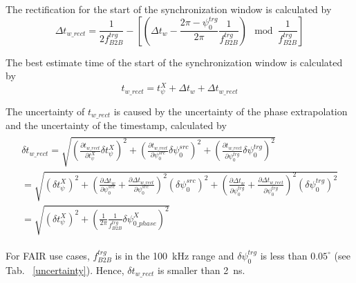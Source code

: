 The rectification for the start of the synchronization window is calculated by
\begin{equation}
\Delta t_\mathit{w\_rect}=\frac{1}{2f^\mathit{trg}_\mathit{B2B}}-[(\Delta t_\mathit{w} - \frac{2\pi-\psi^\mathit{trg}_0}{2\pi}\frac{1}{f^\mathit{trg}_\mathit{B2B}}) \mod \frac{1}{f^\mathit{trg}_\mathit{B2B}}]
\end{equation}

The best estimate time of the start of the synchronization window is calculated by
\begin{equation}
t_\mathit{w\_rect}=t_\psi^\mathit{X}+\Delta t_\mathit{w}+\Delta t_\mathit{w\_rect}
\end{equation}

The uncertainty of $t_\mathit{w\_rect}$ is caused by the uncertainty of the phase extrapolation and the uncertainty of the timestamp, calculated by 
\begin{eqnarray}
\begin{aligned}
\delta t_\mathit{w\_rect} =\sqrt {(\frac {\partial t_\mathit{w\_rect}}{\partial t_\psi^\mathit{X}} \delta t_\psi^\mathit{X})^2 +(\frac {\partial t_\mathit{w\_rect}}{\partial \psi^\mathit{src}_0} \delta\psi^\mathit{src}_0)^2+(\frac {\partial t_\mathit{w\_rect}}{\partial \psi^\mathit{trg}_0} \delta\psi^\mathit{trg}_0)^2  }\\
=\sqrt {(\delta t_\psi^\mathit{X})^2 +(\frac {\partial \Delta t_\mathit{w}}{\partial \psi^\mathit{src}_0}+\frac {\partial \Delta t_\mathit{w\_rect}}{\partial \psi^\mathit{src}_0})^2 (\delta \psi^\mathit{src}_0)^2+(\frac {\partial \Delta t_\mathit{w}}{\partial \psi^\mathit{trg}_0}+\frac {\partial \Delta t_\mathit{w\_rect}}{\partial \psi^\mathit{trg}_0})^2 (\delta\psi^\mathit{trg}_0)^2 }\\
=\sqrt {(\delta t_\psi^\mathit{X})^2 + (\frac{1}{2\pi}\frac{1}{f^\mathit{trg}_\mathit{B2B}}\delta \psi^{X}_\mathit{0\_phase})^2}
\end{aligned}
\end{eqnarray}

For FAIR use cases, $f^\mathit{trg}_\mathit{B2B}$ is in the \SI{100}{kHz} range and $\delta\psi^\mathit{trg}_0$ is less than $0.05^\circ$ (see Tab. ~\ref{uncertainty}). Hence, $\delta t_\mathit{w\_rect}$ is smaller than \SI{2}{ns}. 

